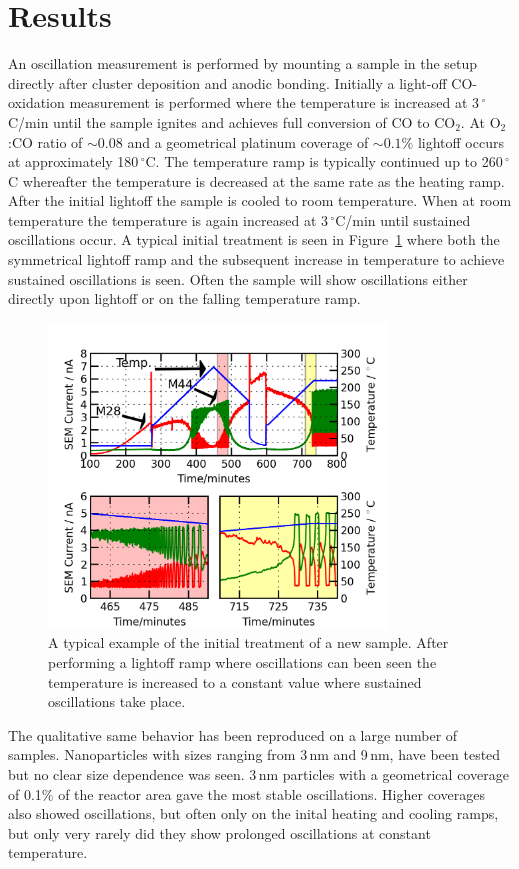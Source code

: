 \documentclass[8.5pt,twoside,twocolumn]{article}
\begin{document}
\section{Results}
An oscillation measurement is performed by mounting a sample in the setup directly after cluster deposition and anodic bonding. Initially a light-off CO-oxidation measurement is performed where the temperature is increased at 3\,$^\circ$C/min until the sample ignites and achieves full conversion of CO to CO$_2$. At O$_2$:CO ratio of $\sim0.08$ and a geometrical platinum coverage of $\sim0.1\%$ lightoff occurs at approximately 180\,$^\circ$C. The temperature ramp is typically continued up to 260\,$^\circ$C whereafter the temperature is decreased at the same rate as the heating ramp. After the initial lightoff the sample is cooled to room temperature. When at room temperature the temperature is again increased at 3\,$^\circ$C/min until sustained oscillations occur. A typical initial treatment is seen in Figure~\ref{fgr:initial_treatment} where both the symmetrical lightoff ramp and the subsequent increase in temperature to achieve sustained oscillations is seen. Often the sample will show oscillations either directly upon lightoff or on the falling temperature ramp.
\begin{figure}[h]
\centering
  \includegraphics[width=9cm]{initial_treatment.png}
  \caption{A typical example of the initial treatment of a new sample. After performing a lightoff ramp where oscillations can been seen the temperature is increased to a constant value where sustained oscillations take place.}
  \label{fgr:initial_treatment}
\end{figure}
The qualitative same behavior has been reproduced on a large number of samples. Nanoparticles with sizes ranging from 3\,nm and 9\,nm, have been tested but no clear size dependence was seen. 3\,nm particles with a geometrical coverage of 0.1\% of the reactor area gave the most stable oscillations. Higher coverages also showed oscillations, but often only on the inital heating and cooling ramps, but only very rarely did they show prolonged oscillations at constant temperature.
\end{document}
